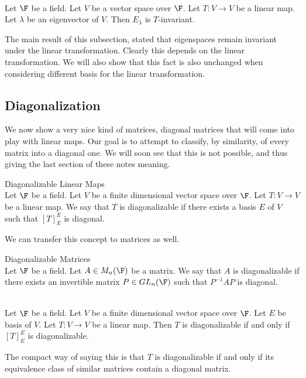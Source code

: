\documentclass[a4paper]{article}
\begin{document}
\begin{prp}{}{}\\
Let $\F$ be a field. Let $V$ be a vector space over $\F$. Let $T:V\to V$ be a linear map. Let $\lambda$ be an eigenvector of $V$. Then $E_\lambda$ is $T$-invariant. 
\end{prp}

The main result of this subsection, stated that eigenspaces remain invariant under the linear transformation. Clearly this depends on the linear transformation. We will also show that this fact is also unchanged when considering different basis for the linear transformation. 

\subsection{Diagonalization}
We now show a very nice kind of matrices, diagonal matrices that will come into play with linear maps. Our goal is to attempt to classify, by similarity, of every matrix into a diagonal one. We will soon see that this is not possible, and thus giving the last section of these notes meaning. 

\begin{defn}{Diagonalizable Linear Maps}{}\\
Let $\F$ be a field. Let $V$ be a finite dimensional vector space over $\F$. Let $T:V\to V$ be a linear map. We say that $T$ is diagonalizable if there exists a basis $E$ of $V$ such that $[T]_E^E$ is diagonal. 
\end{defn}

We can transfer this concept to matrices as well. 

\begin{defn}{Diagonalizable Matrices}{}\\
Let $\F$ be a field. Let $A\in M_n(\F)$ be a matrix. We say that $A$ is diagonalizable if there exists an invertible matrix $P\in GL_n(\F)$ such that $P^{-1}AP$ is diagonal. 
\end{defn}

\begin{lmm}{}{}\\
Let $\F$ be a field. Let $V$ be a finite dimensional vector space over $\F$. Let $E$ be basis of $V$. Let $T:V\to V$ be a linear map. Then $T$ is diagonalizable if and only if $[T]_E^E$ is diagonalizable. 
\end{lmm}

The compact way of saying this is that $T$ is diagonalizable if and only if its equivalence class of similar matrices contain a diagonal matrix. \\
\end{document}
